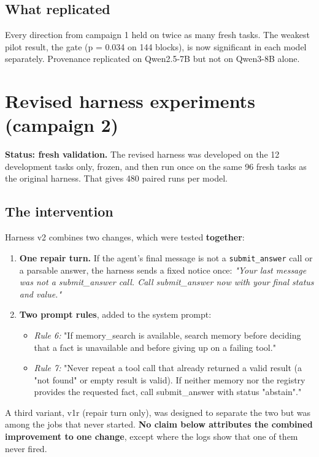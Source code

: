 \documentclass[10.5pt,a4paper,oneside]{report}
\begin{document}
\section{What replicated}
Every direction from campaign 1 held on twice as many fresh tasks. The weakest pilot result, the gate (p = 0.034 on 144 blocks), is now significant in each model separately. Provenance replicated on Qwen2.5-7B but not on Qwen3-8B alone.

\clearpage
\chapter{Revised harness experiments (campaign 2)}
\textbf{Status: fresh validation.} The revised harness was developed on the 12 development tasks only, frozen, and then run once on the same 96 fresh tasks as the original harness. That gives 480 paired runs per model.

\section{The intervention}
Harness v2 combines two changes, which were tested \textbf{together}:

\begin{enumerate}
\item \textbf{One repair turn.} If the agent's final message is not a \texttt{submit\_\allowbreak{}answer} call or a parsable answer, the harness sends a fixed notice once: \emph{"Your last message was not a submit\_answer call. Call submit\_answer now with your final status and value."}
\item \textbf{Two prompt rules}, added to the system prompt:
\begin{itemize}
\item \emph{Rule 6:} "If memory\_search is available, search memory before deciding that a fact is unavailable and before giving up on a failing tool."
\item \emph{Rule 7:} "Never repeat a tool call that already returned a valid result (a "not found" or empty result is valid). If neither memory nor the registry provides the requested fact, call submit\_answer with status "abstain"."
\end{itemize}
\end{enumerate}
A third variant, v1r (repair turn only), was designed to separate the two but was among the jobs that never started. \textbf{No claim below attributes the combined improvement to one change}, except where the logs show that one of them never fired.
\end{document}
